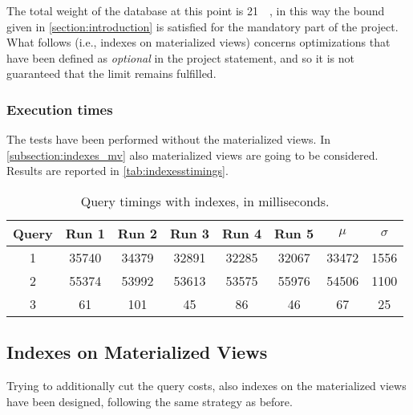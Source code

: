 The total weight of the database at this point is \SI{21}{\giga\byte}, in this way the bound given in \autoref{section:introduction} is satisfied for the mandatory part of the project. What follows (i.e., indexes on materialized views) concerns optimizations that have been defined as \textit{optional} in the project statement, and so it is not guaranteed that the limit remains fulfilled.

\subsubsection{Execution times}

The tests have been performed without the materialized views. In \autoref{subsection:indexes_mv} also materialized views are going to be considered. Results are reported in \autoref{tab:indexesstimings}.

\begin{table}[h!]
\centering
\begin{tabular}{|| c | c c c c c | c c ||} 
 \hline
 Query & Run 1 & Run 2 & Run 3 & Run 4 & Run 5 & 	$\mu$ & $\sigma$ \\ [0.5ex] 
 \hline\hline
 1 & 35740 & 34379 & 32891 & 32285 & 32067 & 33472 & 1556 \\ 
 \hline
 2 & 55374 & 53992 & 53613 & 53575 & 55976 & 54506 & 1100 \\
 \hline
 3 & 61 & 101 & 45 & 86 & 46 & 67 & 25 \\
 \hline
\end{tabular}
  \caption{Query timings with indexes, in milliseconds.}
  \label{tab:indexesstimings}
\end{table}

\subsection{Indexes on Materialized Views}\label{subsection:indexes_mv}
Trying to additionally cut the query costs, also indexes on the materialized views have been designed, following the same strategy as before.

